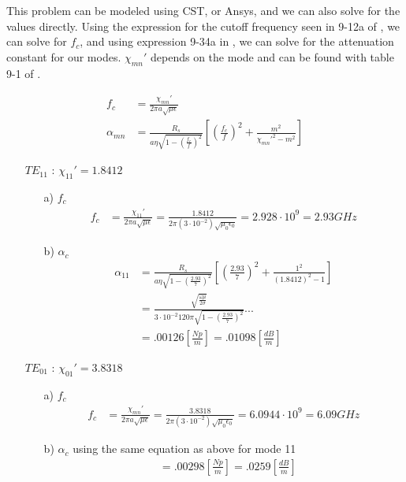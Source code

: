 \documentclass[12pt]{article}
\begin{document}
\noindent
This problem can be modeled using CST, or Ansys, and we can also solve for the values directly. Using the expression for the cutoff frequency seen in 9-12a of \cite{balanis_2012}, we can solve for $f_c$, and using expression 9-34a in  \cite{balanis_2012}, we can solve for the attenuation constant for our modes. $\chi_{mn}'$ depends on the mode and can be found with table 9-1 of \cite{balanis_2012}.

\begin{align*}
  f_c &= \frac{\chi_{mn}'}{2\pi a \sqrt{\mu\epsilon}}\\
  \alpha_{mn} &= \frac{R_s}{a\eta\sqrt{1-\left(\frac{f_c}{f}\right)^2}}\left[ \left(\frac{f_c}{f}\right)^2 + \frac{m^2}{\chi_{mn}'^2- m^2}  \right]
\end{align*}
\begin{itemize}
\item[$TE_{11}$] : $\chi_{11}' = 1.8412$
  \begin{itemize}
  \item [a)] $f_c$\\
    \begin{align*}
      f_c &= \frac{\chi_{11}'}{2\pi a \sqrt{\mu\epsilon}} = \frac{1.8412}{2\pi (3\cdot 10^{-2}) \sqrt{\mu_0\epsilon_0}} = 2.928\cdot 10^{9} = 2.93 GHz 
    \end{align*}
  \item [b)] $\alpha_c$
    \begin{align*}
      \alpha_{11} &= \frac{R_s}{a\eta\sqrt{1-\left(\frac{2.93}{7}\right)^2}}\left[ \left(\frac{2.93}{7}\right)^2 + \frac{1^2}{(1.8412)^2- 1}  \right]\\
                  &= \frac{\sqrt{\frac{\omega \mu}{2\sigma}}}{3\cdot 10^{-2}120\pi\sqrt{1-\left(\frac{2.93}{7}\right)^2}}... \\
      &= .00126 \left[\frac{Np}{m}\right] = .01098 \left[\frac{dB}{m}\right]
    \end{align*}
  \end{itemize}
  \item[$TE_{01}$] : $\chi_{01}' = 3.8318$
  \begin{itemize}
  \item [a)] $f_c$
    \begin{align*}
            f_c &= \frac{\chi_{mn}'}{2\pi a \sqrt{\mu\epsilon}} = \frac{3.8318}{2\pi (3\cdot 10^{-2}) \sqrt{\mu_0\epsilon_0}} = 6.0944\cdot 10^{9} = 6.09 GHz 
    \end{align*}
  \item [b)] $\alpha_c$ using the same equation as above for mode 11
    \begin{align*}
      &= .00298 \left[\frac{Np}{m}\right] = .0259 \left[\frac{dB}{m}\right]
    \end{align*}
  \end{itemize}
\end{itemize}
\end{document}

